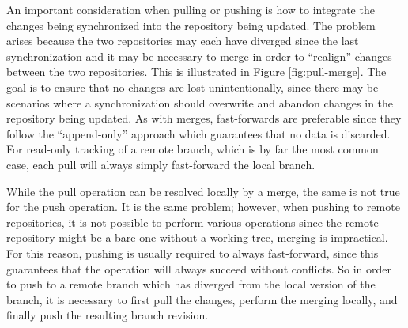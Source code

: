 An important consideration when pulling or pushing is how to integrate
the changes being synchronized into the repository being updated. The
problem arises because the two repositories may each have diverged since
the last synchronization and it may be necessary to merge in order to
``realign'' changes between the two repositories. This is illustrated
in Figure \ref{fig:pull-merge}. The goal is to ensure that no changes
are lost unintentionally, since there may be scenarios where a
synchronization should overwrite and abandon changes in the repository
being updated. As with merges, fast-forwards are preferable since they
follow the ``append-only'' approach which guarantees that no data is
discarded. For read-only tracking of a remote branch, which is by far
the most common case, each pull will always simply fast-forward the
local branch.



While the pull operation can be resolved locally by a merge, the same
is not true for the push operation. It is the same problem; however,
when pushing to remote repositories, it is not possible to perform
various operations since the remote repository might be a bare one
without a working tree, merging is impractical. For this reason,
pushing is usually required to always fast-forward, since this
guarantees that the operation will always succeed without conflicts.
So in order to push to a remote branch which has diverged from the
local version of the branch, it is necessary to first pull the
changes, perform the merging locally, and finally push the resulting branch
revision.
